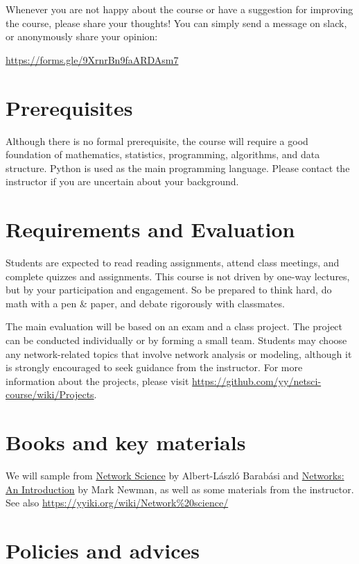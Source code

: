 \documentclass[11pt,article,oneside]{memoir} %
\begin{document}
Whenever you are not happy about the course or have a suggestion for improving the course, please share your thoughts! You can simply send a message on slack, or anonymously share your opinion:

\url{https://forms.gle/9XrnrBn9faARDAsm7}

\section{Prerequisites} %

Although there is no formal prerequisite, the course will require a good foundation of mathematics, statistics, programming, algorithms, and data structure. 
Python is used as the main programming language. 
Please contact the instructor if you are uncertain about your background.

\section{Requirements and Evaluation} %

Students are expected to read reading assignments, attend class meetings, and complete quizzes and assignments. 
This course is not driven by one-way lectures, but by your participation and engagement.
So be prepared to think hard, do math with a pen \& paper, and debate rigorously with classmates. 

The main evaluation will be based on an exam and a class project.
The project can be conducted individually or by forming a small team.
Students may choose any network-related topics that involve network analysis or modeling, although it is strongly encouraged to seek guidance from the instructor.
For more information about the projects, please visit \url{https://github.com/yy/netsci-course/wiki/Projects}.

\section{Books and key materials} %

We will sample from 
\href{http://barabasi.com/networksciencebook/}{Network Science} by Albert-László
Barabási and
\href{https://www.amazon.com/Networks-Mark-Newman/dp/0198805098}{Networks:
An Introduction} by Mark Newman, as well as some materials from the instructor. See also \url{https://yyiki.org/wiki/Network%20science/} 

\section{Policies and advices} %
\end{document}
